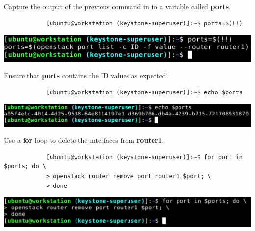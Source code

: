 \documentclass[letterpaper, 12pt]{article}
\begin{document}
\begin{enumerate}
    \begin{labstep}
        Capture the output of the previous command in to a variable called \textbf{ports}.
        \begin{lstlisting}
            [ubuntu@workstation (keystone-superuser)]:~$ ports=$(!!)
        \end{lstlisting}

        \begin{center}
            \includegraphics[width=\linewidth]{images/part1/step18.png}
        \end{center}
    \end{labstep}

    \begin{labstep}
        Ensure that \textbf{ports} contains the ID values as expected.
        \begin{lstlisting}
            [ubuntu@workstation (keystone-superuser)]:~$ echo $ports
        \end{lstlisting}

        \begin{center}
            \includegraphics[width=\linewidth]{images/part1/step19.png}
        \end{center}
    \end{labstep}

    \begin{labstep}
        Use a \textbf{for} loop to delete the interfaces from \textbf{router1}.
        \begin{lstlisting}
            [ubuntu@workstation (keystone-superuser)]:~$ for port in $ports; do \
            > openstack router remove port router1 $port; \
            > done
        \end{lstlisting}

        \begin{center}
            \includegraphics[width=\linewidth]{images/part1/step20.png}
        \end{center}
    \end{labstep}


\end{enumerate}
\end{document}
